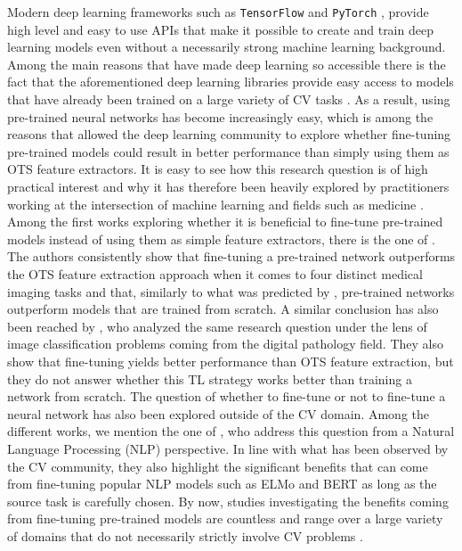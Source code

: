 Modern deep learning frameworks such as \texttt{TensorFlow} \cite{abadi2016tensorflow} and \texttt{PyTorch} \cite{paszke2017automatic}, provide high level and easy to use APIs that make it possible to create and train deep learning models even without a necessarily strong machine learning background. Among the main reasons that have made deep learning so accessible there is the fact that the aforementioned deep learning libraries provide easy access to models that have already been trained on a large variety of CV tasks \cite{russakovsky2015imagenet, lin2014microsoft, everingham2010pascal}. As a result, using pre-trained neural networks has become increasingly easy, which is among the reasons that allowed the deep learning community to explore whether fine-tuning pre-trained models could result in better performance than simply using them as OTS feature extractors. It is easy to see how this research question is of high practical interest and why it has therefore been heavily explored by practitioners working at the intersection of machine learning and fields such as medicine \cite{tajbakhsh2016convolutional,ho2021evaluation}. Among the first works exploring whether it is beneficial to fine-tune pre-trained models instead of using them as simple feature extractors, there is the one of \citet{tajbakhsh2016convolutional}. The authors consistently show that fine-tuning a pre-trained network outperforms the OTS feature extraction approach when it comes to four distinct medical imaging tasks and that, similarly to what was predicted by \citet{zeiler2014visualizing}, pre-trained networks outperform models that are trained from scratch. A similar conclusion has also been reached by \citet{mormont2018comparison}, who analyzed the same research question under the lens of image classification problems coming from the digital pathology field. They also show that fine-tuning yields better performance than OTS feature extraction, but they do not answer whether this TL strategy works better than training a network from scratch. The question of whether to fine-tune or not to fine-tune a neural network has also been explored outside of the CV domain. Among the different works, we mention the one of \citet{peters2019tune}, who address this question from a Natural Language Processing (NLP) perspective. In line with what has been observed by the CV community, they also highlight the significant benefits that can come from fine-tuning popular NLP models such as ELMo \cite{peters2018deep} and BERT \cite{devlin2018bert} as long as the source task is carefully chosen. By now, studies investigating the benefits coming from fine-tuning pre-trained models are countless and range over a large variety of domains that do not necessarily strictly involve CV problems \cite{ackermann2018using,dominguez2019transfer,george2017deep,boulanger2013audio,deng2013new,kong2020panns,zarrella2016mitre,howard2018universal,houlsby2019parameter}.


